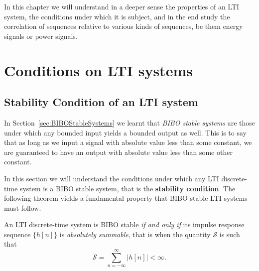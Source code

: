 \documentclass[\documentfontsize, twocolumn]{\classname}
\begin{document}
In this chapter we will understand in a deeper sense the properties of an LTI system, the conditions under which it is subject, and in the end study the correlation of sequences relative to various kinds of sequences, be them energy signals or power signals.

\section{Conditions on LTI systems}

\subsection{Stability Condition of an LTI system}

In Section~\ref{sec:BIBOStableSystems} we learnt that \emph{BIBO stable systems} are those under which any bounded input yields a bounded output as well. This is to say that as long as we input a signal with absolute value less than some constant, we are guaranteed to have an output with absolute value less than some other constant.

In this section we will understand the conditions under which any LTI discrete-time system is a BIBO stable system, that is the \textbf{stability condition}. The following theorem yields a fundamental property that BIBO stable LTI systems must follow.

\begin{thm}\label{thm:ltiBiboStability}
An LTI discrete-time system is BIBO stable \emph{if and only if} its impulse response sequence $\{h[n]\}$ is \emph{absolutely summable}, that is when the quantity $\mathcal S$ is such that
    \begin{equation}\label{eqn:ltiBiboStability}
        \mathcal S = \sum_{n=-\infty}^\infty \left|h[n]\right| < \infty.
    \end{equation}
\end{thm}
\end{document}
